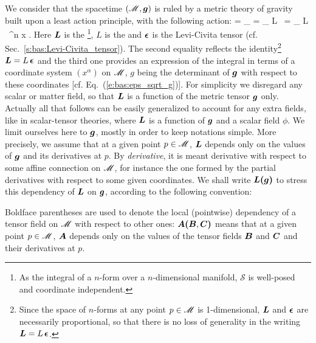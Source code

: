 We consider that the spacetime $(\mathscr{M},\bm{g})$ is ruled by a metric theory of gravity built upon
a least action principle, with the following action:
\be \label{e:tha:action_L}
     = \int_{\M}  = \int_{\M} L \, \weps = \int_{\M} L  \, \D^n x .
\ee
Here $\bm{L}$ is the \footnote{As the integral of a $n$-form over a $n$-dimensional manifold, $\mathcal{S}$ is well-posed and coordinate independent.},
$L$ is the 
and
$\bm{\epsilon}$ is the Levi-Civita tensor (cf. Sec.~\ref{s:bas:Levi-Civita_tensor}).
The second equality reflects the identity\footnote{Since the space of $n$-forms at any
point $p\in\mathscr{M}$ is 1-dimensional, $\bm{L}$ and $\bm{\epsilon}$ are
necessarily proportional, so that there is no loss of generality in the writing
$\bm{L} = L \, \bm{\epsilon}$.} $\bm{L} = L \, \bm{\epsilon}$ and the third one provides an expression of the integral
in terms of a coordinate system $(x^\alpha)$ on $\mathscr{M}$, $g$ being the determinant of
$\bm{g}$ with respect to these coordinates [cf. Eq.~(\ref{e:bas:eps_sqrt_g})].
For simplicity we disregard any scalar or matter field, so that
$\bm{L}$ is a function of the metric tensor $\bm{g}$ only.
Actually all that follows can be easily generalized to account for
any extra fields, like in scalar-tensor theories, where $\bm{L}$ is a function
of $\bm{g}$ and a scalar field $\phi$. We limit ourselves here to $\bm{g}$,
mostly in order to keep notations simple.
More precisely, we assume that at a given point $p\in\mathscr{M}$, $\bm{L}$ depends only
on the values of $\bm{g}$ and its derivatives at $p$. By \emph{derivative}, it is
meant derivative with respect to some affine connection on $\mathscr{M}$, for instance the one
formed by the partial derivatives with respect to some given coordinates. We shall
write $\bm{L}\textbf{(}\bm{g}\textbf{)}$ to stress this dependency of $\bm{L}$ on $\bm{g}$, according
to the following convention:
\begin{notation}
\label{n:tha:bold_parentheses}
Boldface parentheses are used to denote the local (pointwise) dependency of a
tensor field on $\mathscr{M}$ with respect to other ones: $\bm{A}\textbf{(} \bm{B}, \bm{C} \textbf{)}$
means that at a given point $p\in\mathscr{M}$, $\bm{A}$ depends only
on the values of the tensor fields $\bm{B}$ and $\bm{C}$ and their derivatives at $p$.
\end{notation}

